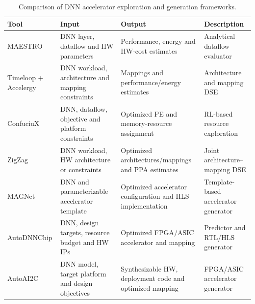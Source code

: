 \begin{table}[htbp]
\centering
\caption{Comparison of DNN accelerator exploration and generation frameworks.}
\label{tab:dnn_tool_comparison}

\small
\setlength{\tabcolsep}{4pt}
\renewcommand{\arraystretch}{1.2}

\begin{tabularx}{\textwidth}{
    |>{\raggedright\arraybackslash}p{2.4cm}
    |>{\raggedright\arraybackslash}X
    |>{\raggedright\arraybackslash}X
    |>{\raggedright\arraybackslash}X|
}
\hline
\textbf{Tool} & \textbf{Input} & \textbf{Output} & \textbf{Description} \\
\hline

MAESTRO \cite{maestro} &
DNN layer, dataflow and HW parameters &
Performance, energy and HW-cost estimates &
Analytical dataflow evaluator \\
\hline

Timeloop + Accelergy \cite{timeloop,accelergy} &
DNN workload, architecture and mapping constraints &
Mappings and performance/energy estimates &
Architecture and mapping DSE \\
\hline

ConfuciuX \cite{confuciux} &
DNN, dataflow, objective and platform constraints &
Optimized PE and memory-resource assignment &
RL-based resource exploration \\
\hline

ZigZag \cite{zigzag} &
DNN workload, HW architecture or constraints &
Optimized architectures/mappings and PPA estimates &
Joint architecture--mapping DSE \\
\hline

MAGNet \cite{magnet} &
DNN and parameterizable accelerator template &
Optimized accelerator configuration and HLS implementation &
Template-based accelerator generator \\
\hline

AutoDNNChip \cite{autodnnchip} &
DNN, design targets, resource budget and HW IPs &
Optimized FPGA/ASIC accelerator and mapping &
Predictor and RTL/HLS generator \\
\hline

AutoAI2C \cite{autoai2c} &
DNN model, target platform and design objectives &
Synthesizable HW, deployment code and optimized mapping &
FPGA/ASIC accelerator generator \\
\hline

\end{tabularx}
\end{table}
